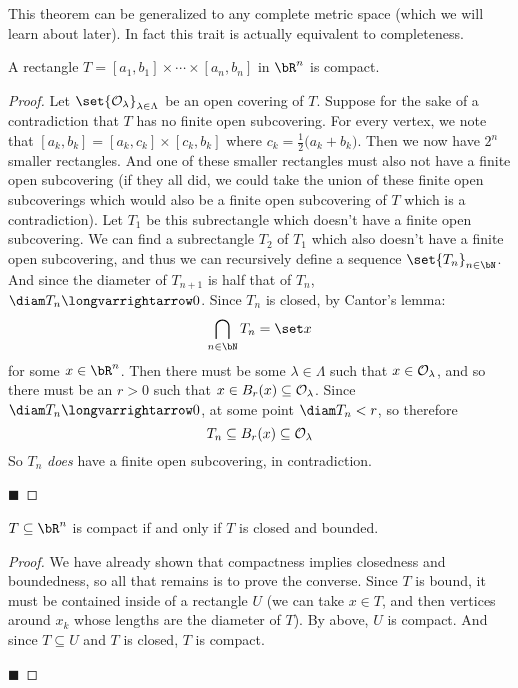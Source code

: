 \documentclass[10pt]{article}
\def\openset{{\cal O}}
\begin{document}
This theorem can be generalized to any complete metric space (which we will learn about later).
In fact this trait is actually equivalent to completeness.

\begin{thrm*}

    A rectangle $T=[a_1,b_1]\times\cdots\times[a_n,b_n]$ in $\bR^n$ is compact.

\end{thrm*}

\begin{proof}

    Let $\set{\openset_\lambda}_{\lambda\in\Lambda}$ be an open covering of $T$.
    Suppose for the sake of a contradiction that $T$ has no finite open subcovering.
    For every vertex, we note that $[a_k,b_k]=[a_k,c_k]\times[c_k,b_k]$ where $c_k=\frac12\big(a_k+b_k\big)$.
    Then we now have $2^n$ smaller rectangles.
    And one of these smaller rectangles must also not have a finite open subcovering (if they all did, we could take the union of these finite open subcoverings which would
    also be a finite open subcovering of $T$ which is a contradiction).
    Let $T_1$ be this subrectangle which doesn't have a finite open subcovering.
    We can find a subrectangle $T_2$ of $T_1$ which also doesn't have a finite open subcovering, and thus we can recursively define a sequence $\set{T_n}_{n\in\bN}$.
    And since the diameter of $T_{n+1}$ is half that of $T_n$, $\diam T_n\longvarrightarrow0$.
    Since $T_n$ is closed, by Cantor's lemma:
    \[ \bigcap_{n\in\bN} T_n = \set x \]
    for some $x\in\bR^n$.
    Then there must be some $\lambda\in\Lambda$ such that $x\in\openset_\lambda$, and so there must be an $r>0$ such that $x\in B_r(x)\subseteq\openset_\lambda$.
    Since $\diam T_n\longvarrightarrow0$, at some point $\diam T_n<r$, so therefore
    \[ T_n\subseteq B_r(x) \subseteq \openset_\lambda \]
    So $T_n$ \emph{does} have a finite open subcovering, in contradiction. \lightning

    \hfill$\blacksquare$

\end{proof}

\begin{thrm*}

    $T\subseteq\bR^n$ is compact if and only if $T$ is closed and bounded.

\end{thrm*}

\begin{proof}

    We have already shown that compactness implies closedness and boundedness, so all that remains is to prove the converse.
    Since $T$ is bound, it must be contained inside of a rectangle $U$ (we can take $x\in T$, and then vertices around $x_k$ whose lengths are the diameter of $T$).
    By above, $U$ is compact.
    And since $T\subseteq U$ and $T$ is closed, $T$ is compact.

    \hfill$\blacksquare$

\end{proof}
\end{document}
